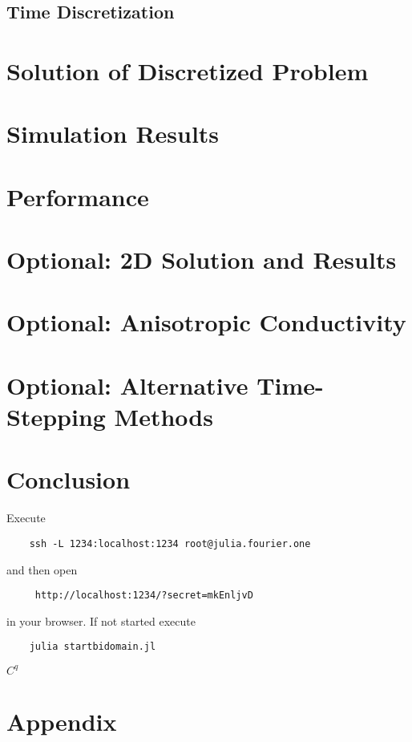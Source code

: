 \documentclass{finalproject}
\begin{document}
\subsection{Time Discretization}

\section{Solution of Discretized Problem}

\section{Simulation Results}

\section{Performance}

\section{Optional: 2D Solution and Results}
\section{Optional: Anisotropic Conductivity}
\section{Optional: Alternative Time-Stepping Methods}


\section{Conclusion}
Execute
\begin{verbatim}
    ssh -L 1234:localhost:1234 root@julia.fourier.one
\end{verbatim}
and then open
\begin{verbatim}
     http://localhost:1234/?secret=mkEnljvD
\end{verbatim}
in your browser. If not started execute
\begin{verbatim}
    julia startbidomain.jl
\end{verbatim}
$C^q$
\printbibliography
\clearpage
\section*{Appendix}
\end{document}
